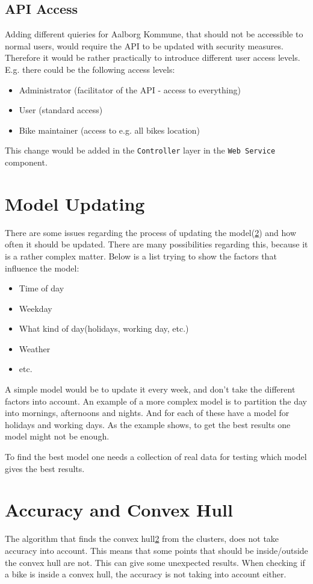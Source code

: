 \subsection{API Access}
Adding different quieries for Aalborg Kommune, that should not be accessible to normal users, would require the API to be updated with security measures.
Therefore it would be rather practically to introduce different user access levels.
E.g. there could be the following access levels:
\begin{itemize}
\item Administrator (facilitator of the API - access to everything)
\item User (standard access)
\item Bike maintainer (access to e.g. all bikes location)
\end{itemize}
This change would be added in the \texttt{Controller} layer in the \texttt{Web Service} component.

\section{Model Updating}\label{reflection:model_updating}
There are some issues regarding the process of updating the model(\cref{}) and how often it should be updated.
There are many possibilities regarding this, because it is a rather complex matter.
Below is a list trying to show the factors that influence the model:
\begin{itemize}
\item Time of day
\item Weekday
\item What kind of day(holidays, working day, etc.)
\item Weather
\item etc.
\end{itemize}
A simple model would be to update it every week, and don't take the different factors into account.
An example of a more complex model is to partition the day into mornings, afternoons and nights.
And for each of these have a model for holidays and working days.
As the example shows, to get the best results one model might not be enough. 

To find the best model one needs a collection of real data for testing which model gives the best results.


\section{Accuracy and Convex Hull}
The algorithm that finds the convex hull\cref{} from the clusters, does not take accuracy into account.
This means that some points that should be inside/outside the convex hull are not.
This can give some unexpected results.
When checking if a bike is inside a convex hull, the accuracy is not taking into account either.
